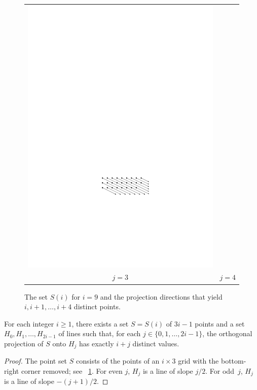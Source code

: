\documentclass{ws-ijcga}
\begin{document}
\begin{figure}
\begin{tabular}{cc}
     \includegraphics[scale=0.9]{j4} \\
      $j=3$ & $j=4$
  \end{tabular}
  \caption{The set $S(i)$  for $i=9$ and the projection directions that yield $i,i+1,\ldots,i+4$ distinct points.}
  \label{fig:lower-bound}
\end{figure}


\begin{lemma}\label{lem:lower-bound}
For each integer $i\ge 1$, there exists a set $S=S(i)$ of $3i-1$
points and a set $H_0,H_1,\ldots,H_{2i-1}$ of lines such that, for each
$j\in\{0,1,\ldots,2i-1\}$, the orthogonal projection of $S$ onto $H_j$
has exactly $i+j$ distinct values.
\end{lemma}

\begin{proof}
The point set $S$ consists of the points of an $i\times 3$ grid with the bottom-right corner removed; see \figurename~\ref{fig:lower-bound}.  For even $j$, $H_j$ is a line of slope $j/2$.  For odd~$j$, $H_j$ is a line of slope $-(j+1)/2$.
\end{proof}
\end{document}
